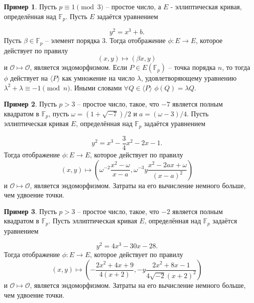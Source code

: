 \documentclass[a4paper,12pt]{article}
\theoremstyle{definition}
\theoremstyle{underline}
\newtheorem{example}{Пример}
\begin{document}
	\begin{example}
		Пусть $p \equiv 1 \pmod{3}$ -- простое число, а $E$ - эллиптическая кривая, определённая над $\mathbb{F}_p$. Пусть $E$ задаётся уравнением 
		
		\begin{equation}
			y^2 = x^3 + b.
		\end{equation}
		Пусть $\beta \in \mathbb{F}_p$ -- элемент порядка 3. Тогда отображение $\phi: E \rightarrow E$, которое действует по правилу  
		\[(x, y) \mapsto (\beta x, y)\]
		 и $\mathcal{O} \mapsto \mathcal{O}$, является эндоморфизмом. Если $P \in E(\mathbb{F}_p)$ -- точка порядка $n$, то тогда $\phi$ действует на $\langle P\rangle$ как умножение на число $\lambda$, удовлетворяющему уравнению $\lambda^2 + \lambda \equiv -1 \pmod{n}$. Иными словами $\forall Q \in \langle P\rangle$ $\phi(Q) = \lambda Q$.
		
	\end{example}

	\begin{example}
		Пусть $p>3$ -- простое число, такое, что $-7$ является полным квадратом в $\mathbb{F}_p$, пусть $\omega = (1+\sqrt{-7})/2$ и $a = (\omega - 3)/4 $. Пусть эллиптическая кривая $E$, определённая над $\mathbb{F}_p$ задаётся уравнением
	
		\begin{equation}
			y^2 = x^3 - \frac{3}{4} x^2 - 2 x - 1.
		\end{equation}
		Тогда отображение $\phi: E \rightarrow E$, которое действует по правилу 
		\[ (x, y) \mapsto \left(\omega^{-2} \frac{x^2 - \omega}{x - a}, \omega^{-3} y \frac{x^2 - 2 a x + \omega}{(x - a)^2}\right) \]
		и $\mathcal{O} \mapsto \mathcal{O}$, является эндоморфизмом. Затраты на его вычисление немного больше, чем удвоение точки.
	
	\end{example}

	\begin{example}
		Пусть $p>3$ -- простое число, такое, что $-2$ является полным квадратом в $\mathbb{F}_p$. Пусть эллиптическая кривая $E$, определённая над $\mathbb{F}_p$ задаётся уравнением
		
		\begin{equation}
			y^2 = 4x^3 -30 x - 28.
		\end{equation}
		Тогда отображение $\phi: E \rightarrow E$, которое действует по правилу 
		\[ (x, y) \mapsto \left(- \frac{2x^2 + 4x + 9}{4(x + 2)}, -y \frac{2x^2 + 8x - 1}{4 \sqrt{-2} (x + 2)^2}\right) \]
		и $\mathcal{O} \mapsto \mathcal{O}$, является эндоморфизмом. Затраты на его вычисление немного больше, чем удвоение точки. 
		
	\end{example}
	
\end{document}
